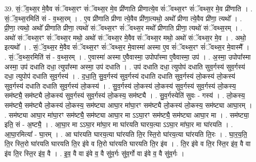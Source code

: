 \documentclass[17pt]{extarticle}
\begin{document}
39. सं॒ॅव॒थ्स॒र मे॒वैव सं॑ॅवथ्स॒रꣳ सं॑ॅवथ्स॒र मे॒व प्री॑णाति प्रीणात्ये॒व सं॑ॅवथ्स॒रꣳ सं॑ॅवथ्स॒र मे॒व प्री॑णाति । . सं॒ॅव॒थ्स॒रमिति॑ सं - व॒थ्स॒रम् । . ए॒व प्री॑णाति प्रीणा त्ये॒वैव प्री॑णा॒त्यथो॒ अथो᳚ प्रीणा त्ये॒वैव प्री॑णा॒ त्यथो᳚ । . प्री॒णा॒ त्यथो॒ अथो᳚ प्रीणाति प्रीणा॒ त्यथो॑ संॅवथ्स॒रꣳ सं॑ॅवथ्स॒र मथो᳚ प्रीणाति प्रीणा॒ त्यथो॑ संॅवथ्स॒रम् । . अथो॑ संॅवथ्स॒रꣳ सं॑ॅवथ्स॒र मथो॒ अथो॑ संॅवथ्स॒र मे॒वैव सं॑ॅवथ्स॒र मथो॒ अथो॑ संॅवथ्स॒र मे॒व । . अथो॒ इत्यथो᳚ । . सं॒ॅव॒थ्स॒र मे॒वैव सं॑ॅवथ्स॒रꣳ सं॑ॅवथ्स॒र मे॒वास्मा॑ अस्मा ए॒व सं॑ॅवथ्स॒रꣳ सं॑ॅवथ्स॒र मे॒वास्मै᳚ । . सं॒ॅव॒थ्स॒रमिति॑ सं - व॒थ्स॒रम् । . ए॒वास्मा॑ अस्मा ए॒वैवास्मा॒ उपोपा᳚स्मा ए॒वैवास्मा॒ उप॑ । . अ॒स्मा॒ उपोपा᳚स्मा अस्मा॒ उप॑ दधाति दधा॒ त्युपा᳚स्मा अस्मा॒ उप॑ दधाति । . उप॑ दधाति दधा॒ त्युपोप॑ दधाति सुव॒र्गस्य॑ सुव॒र्गस्य॑ दधा॒ त्युपोप॑ दधाति सुव॒र्गस्य॑ । . द॒धा॒ति॒ सु॒व॒र्गस्य॑ सुव॒र्गस्य॑ दधाति दधाति सुव॒र्गस्य॑ लो॒कस्य॑ लो॒कस्य॑ सुव॒र्गस्य॑ दधाति दधाति सुव॒र्गस्य॑ लो॒कस्य॑ । . सु॒व॒र्गस्य॑ लो॒कस्य॑ लो॒कस्य॑ सुव॒र्गस्य॑ सुव॒र्गस्य॑ लो॒कस्य॒ सम॑ष्ट्यै॒ सम॑ष्ट्यै लो॒कस्य॑ सुव॒र्गस्य॑ सुव॒र्गस्य॑ लो॒कस्य॒ सम॑ष्ट्यै । . सु॒व॒र्गस्येति॑ सुवः - गस्य॑ । . लो॒कस्य॒ सम॑ष्ट्यै॒ सम॑ष्ट्यै लो॒कस्य॑ लो॒कस्य॒ सम॑ष्ट्या आघा॒र मा॑घा॒रꣳ सम॑ष्ट्यै लो॒कस्य॑ लो॒कस्य॒ सम॑ष्ट्या आघा॒रम् । . सम॑ष्ट्या आघा॒र मा॑घा॒रꣳ सम॑ष्ट्यै॒ सम॑ष्ट्या आघा॒र मा ऽऽघा॒रꣳ सम॑ष्ट्यै॒ सम॑ष्ट्या आघा॒र मा । . सम॑ष्ट्या॒ इति॒ सं - अ॒ष्ट्यै॒ । . आ॒घा॒र मा ऽऽघा॒र मा॑घा॒र मा घा॑रयति घारय॒त्या ऽऽघा॒र मा॑घा॒र मा घा॑रयति । . आ॒घा॒रमित्या᳚ - घा॒रम् । . आ घा॑रयति घारय॒त्या घा॑रयति ति॒र स्ति॒रो घा॑रय॒त्या घा॑रयति ति॒रः । . घा॒र॒य॒ति॒ ति॒र स्ति॒रो घा॑रयति घारयति ति॒र इ॑वे व ति॒रो घा॑रयति घारयति ति॒र इ॑व । . ति॒र इ॑वे व ति॒र स्ति॒र इ॑व॒ वै वा इ॑व ति॒र स्ति॒र इ॑व॒ वै । . इ॒व॒ वै वा इ॑वे व॒ वै सु॑व॒र्गः सु॑व॒र्गो वा इ॑वे व॒ वै सु॑व॒र्गः । \newline
\pagebreak
{}
\end{document}

